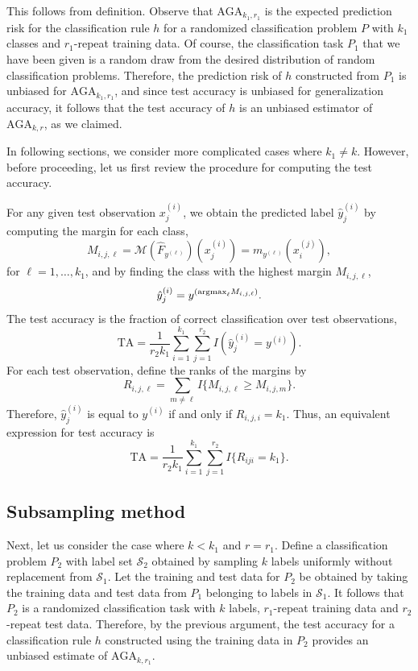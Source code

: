 \documentclass[12pt]{article}
\begin{document}
This follows from definition.  Observe that $\text{AGA}_{k_1,r_1}$ is
the expected prediction risk for the classification rule $h$ for a
randomized classification problem $P$ with $k_1$ classes and
$r_1$-repeat training data.  Of course, the classification task $P_1$
that we have been given is a random draw from the desired
distribution of random classification problems.  Therefore, the
prediction risk of $h$ constructed from $P_1$ is unbiased for
$\text{AGA}_{k_1, r_1}$, and since test accuracy is unbiased for
generalization accuracy, it follows that the test accuracy of $h$ is
an unbiased estimator of $\text{AGA}_{k,r}$, as we claimed.

In following sections, we consider more complicated cases where $k_1
\neq k$.  However, before proceeding, let us first review the
procedure for computing the test accuracy.

For any given test observation $x_j^{(i)}$, we obtain the predicted
label $\hat{y}_j^{(i)}$ by computing the margin for each class,
\[
M_{i,j,\ell} = \mathcal{M}(\hat{F}_{y^{(\ell)}})(x_j^{(i)}) =  m_{y^{(\ell)}}(x_i^{(j)}),
\]
for $\ell = 1,\hdots, k_1$,
and by finding the class with the highest margin $M_{i, j, \ell}$,
\[
\hat{y}_j^{(i)} = y^{(\text{argmax}_\ell M_{i, j, \ell})}.
\]
The test accuracy is the fraction of correct classification over test observations,
\begin{equation}
\text{TA} = \frac{1}{r_2k_1} \sum_{i=1}^{k_1} \sum_{j=1}^{r_2} I(\hat{y}_j^{(i)} = y^{(i)}).
\end{equation}
For each test observation, define the ranks of the margins by
\[
R_{i,j,\ell} = \sum_{m \neq \ell} I\{M_{i,j,\ell} \geq M_{i, j, m}\}.
\]
Therefore, $\hat{y}_j^{(i)}$ is equal to $y^{(i)}$ if and only if $R_{i,j,i} = k_1$.
Thus, an equivalent expression for test accuracy is
\begin{equation}\label{eq:test_risk}
\text{TA} = \frac{1}{r_2 k_1} \sum_{i=1}^{k_1} \sum_{j=1}^{r_2} I\{R_{iji} = k_1\}.
\end{equation}

\subsection{Subsampling method}

Next, let us consider the case where $k < k_1$ and $r=r_1$.  Define a
classification problem $P_2$ with label set $\mathcal{S}_2$ obtained
by sampling $k$ labels uniformly without replacement from
$\mathcal{S}_1$.  Let the training and test data for $P_2$ be obtained
by taking the training data and test data from $P_1$ belonging to
labels in $\mathcal{S}_1$.  It follows that $P_2$ is a randomized
classification task with $k$ labels, $r_1$-repeat training data and
$r_2$-repeat test data.  Therefore, by the previous argument, the test
accuracy for a classification rule $h$ constructed using the training data
in $P_2$ provides an unbiased estimate of $\text{AGA}_{k, r_1}$.
\end{document}
